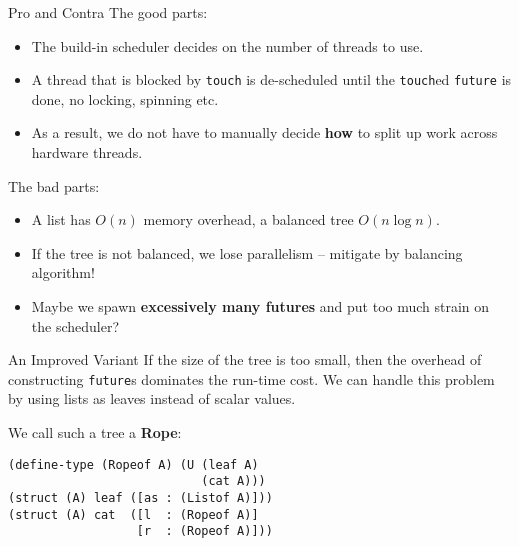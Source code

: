 \documentclass{beamer}
\begin{document}
\begin{frame}{Pro and Contra}
  The good parts:

  \begin{itemize}
  \pause{} \item The build-in scheduler decides on the number of threads to use.
  \pause{} \item A thread that is blocked by \lstinline{touch} is de-scheduled until the \lstinline{touch}ed \lstinline{future} is done, no locking, spinning etc.
  \pause{} \item As a result, we do not have to manually decide \textbf{how} to split up work across hardware threads.
  \end{itemize}

  \pause{}

  The bad parts:
  \begin{itemize}
  \pause{} \item A list has $O(n)$ memory overhead, a balanced tree $O(n \log n)$.
  \pause{} \item If the tree is not balanced, we lose parallelism -- mitigate by balancing algorithm!
  \pause{} \item Maybe we spawn \textbf{excessively many futures} and put too much strain on the scheduler?
  \end{itemize}
\end{frame}

\begin{frame}[fragile]{An Improved Variant}
If the size of the tree is too small, then the overhead of constructing \lstinline{future}s dominates the run-time cost. We can handle this problem by using lists as leaves instead of scalar values.

\pause{} \vspace{0.5cm}

We call such a tree a \textbf{Rope}:

\begin{lstlisting}
(define-type (Ropeof A) (U (leaf A)
                           (cat A)))
(struct (A) leaf ([as : (Listof A)]))
(struct (A) cat  ([l  : (Ropeof A)]
                  [r  : (Ropeof A)]))
\end{lstlisting}
\end{frame}
\end{document}
